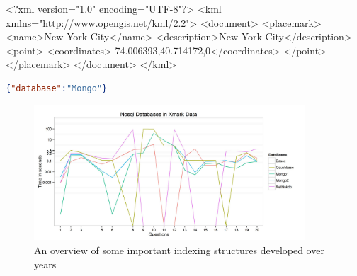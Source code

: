 \begin{fakeXML}[label=kml,caption=A simple KML example representing a Point]
<?xml version="1.0" encoding="UTF-8"?>
<kml xmlns="http://www.opengis.net/kml/2.2">
<document>
<placemark>
  <name>New York City</name>
  <description>New York City</description>
  <point>
    <coordinates>-74.006393,40.714172,0</coordinates>
  </point>
</placemark>
</document>
</kml>
\end{fakeXML} 

\begin{fakeJSON}[label=kml,caption=JSON Data]
\end{fakeJSON} 

\begin{lstlisting}[language=json,firstnumber=1]
{"database":"Mongo"}
\end{lstlisting}
\begin{figure}
	\centering
	\includegraphics[width=0.9\textwidth]{img/Plot7}
	\caption{An overview of some important indexing structures developed over years}
	\label{trees}
\end{figure}

